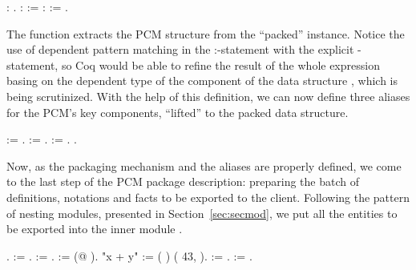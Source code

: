 \begin{coqdoccode}
\coqdocnoindent
{} : .\coqdoceol
\coqdocemptyline
\coqdocnoindent
{}  :   := \coqdoceol
\coqdocindent{2.00em}
:  \coqdocvar{\_}  :=      .\coqdoceol
\coqdocemptyline
\end{coqdoccode}


The function  extracts the PCM structure from the ``packed''
instance. Notice the use of dependent pattern matching
 in the :-statement with the
explicit -statement, so Coq would be able to refine the result
of the whole expression basing on the dependent type of the 
component of the data structure , which is being scrutinized. With
the help of this definition, we can now define three aliases for the
PCM's key components, ``lifted'' to the packed data structure.


\begin{coqdoccode}
\coqdocemptyline
\coqdocnoindent
{}  :=  .\coqdoceol
\coqdocnoindent
{}  :=  .\coqdoceol
\coqdocnoindent
{}  :=  .\coqdoceol
\coqdocemptyline
\coqdocnoindent
{} .\coqdoceol
\coqdocemptyline
\end{coqdoccode}


Now, as the packaging mechanism and the aliases are properly defined,
we come to the last step of the PCM package description: preparing the
batch of definitions, notations and facts to be exported to the
client. Following the pattern of nesting modules, presented in
Section~\ref{sec:secmod}, we put all the entities to be exported
into the inner module .


\begin{coqdoccode}
\coqdocemptyline
\coqdocnoindent
{} .\coqdoceol
\coqdocemptyline
\coqdocnoindent
{}  := .\coqdoceol
\coqdocnoindent
{}  := .\coqdoceol
\coqdocnoindent
{}    := (@  ).\coqdoceol
\coqdocemptyline
\coqdocnoindent
{} "x + y" := (  ) (  43,  ).\coqdoceol
\coqdocnoindent
{}  := .\coqdoceol
\coqdocnoindent
{}  := .\coqdoceol
\coqdocemptyline
\end{coqdoccode}


